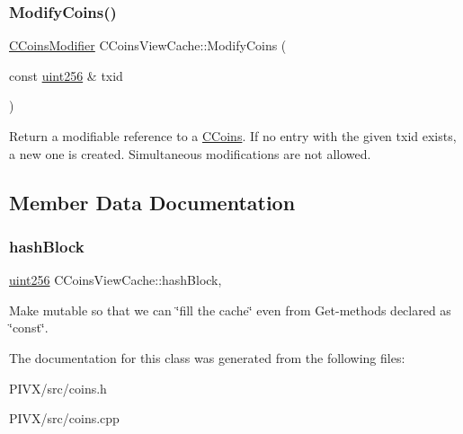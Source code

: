 \subsubsection{\texorpdfstring{Modify\+Coins()}{ModifyCoins()}}
{\footnotesize\ttfamily \mbox{\hyperlink{class_c_coins_modifier}{C\+Coins\+Modifier}} C\+Coins\+View\+Cache\+::\+Modify\+Coins (\begin{DoxyParamCaption}\item[{const \mbox{\hyperlink{classuint256}{uint256}} \&}]{txid }\end{DoxyParamCaption})}

Return a modifiable reference to a \mbox{\hyperlink{class_c_coins}{C\+Coins}}. If no entry with the given txid exists, a new one is created. Simultaneous modifications are not allowed. 

\subsection{Member Data Documentation}
\mbox{\label{class_c_coins_view_cache_a229dddddbc5501edc250209a2ce5df8b}} 
\subsubsection{\texorpdfstring{hash\+Block}{hashBlock}}
{\footnotesize\ttfamily \mbox{\hyperlink{classuint256}{uint256}} C\+Coins\+View\+Cache\+::hash\+Block\hspace{0.3cm}{\ttfamily [mutable]}, {\ttfamily [protected]}}

Make mutable so that we can \char`\"{}fill the cache\char`\"{} even from Get-\/methods declared as \char`\"{}const\char`\"{}. 

The documentation for this class was generated from the following files\+:\begin{DoxyCompactItemize}
\item 
P\+I\+V\+X/src/coins.\+h\item 
P\+I\+V\+X/src/coins.\+cpp\end{DoxyCompactItemize}
